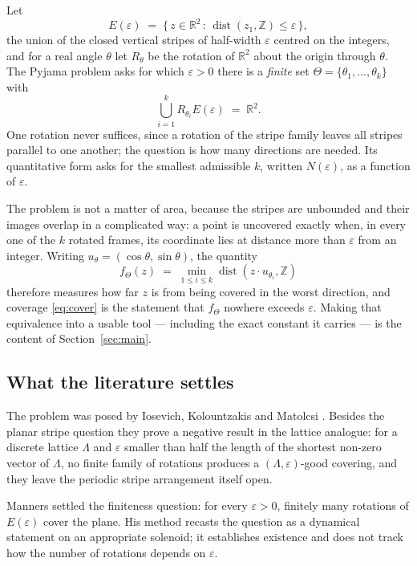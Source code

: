 \documentclass[11pt]{article}
\theoremstyle{plain}
\theoremstyle{definition}
\theoremstyle{remark}
\newcommand{\dZ}{\operatorname{dist}}
\newcommand{\R}{\mathbb{R}}
\newcommand{\Z}{\mathbb{Z}}
\begin{document}
Let
\begin{equation}
E(\varepsilon)\;=\;\{\,z\in\R^2\,:\,\dZ(z_1,\Z)\le\varepsilon\,\},
\label{eq:stripe}
\end{equation}
the union of the closed vertical stripes of half-width $\varepsilon$ centred on the integers, and for a
real angle $\theta$ let $R_\theta$ be the rotation of $\R^2$ about the origin through $\theta$. The
Pyjama problem asks for which $\varepsilon>0$ there is a \emph{finite} set
$\Theta=\{\theta_1,\dots,\theta_k\}$ with
\begin{equation}
\bigcup_{i=1}^{k}R_{\theta_i}E(\varepsilon)\;=\;\R^2 .
\label{eq:cover}
\end{equation}
One rotation never suffices, since a rotation of the stripe family leaves all stripes parallel to one
another; the question is how many directions are needed. Its quantitative form asks for the smallest
admissible $k$, written $N(\varepsilon)$, as a function of $\varepsilon$.

The problem is not a matter of area, because the stripes are unbounded and their images overlap in a
complicated way: a point is uncovered exactly when, in every one of the $k$ rotated frames, its
coordinate lies at distance more than $\varepsilon$ from an integer. Writing
$u_\theta=(\cos\theta,\sin\theta)$, the quantity
\begin{equation}
f_\Theta(z)\;=\;\min_{1\le i\le k}\dZ(z\cdot u_{\theta_i},\Z)
\label{eq:f}
\end{equation}
therefore measures how far $z$ is from being covered in the worst direction, and coverage \eqref{eq:cover}
is the statement that $f_\Theta$ nowhere exceeds $\varepsilon$. Making that equivalence into a usable
tool --- including the exact constant it carries --- is the content of Section~\ref{sec:main}.

\subsection{What the literature settles}

The problem was posed by Iosevich, Kolountzakis and Matolcsi \cite{ikm2006}. Besides the planar stripe
question they prove a negative result in the lattice analogue: for a discrete lattice $\Lambda$ and
$\varepsilon$ smaller than half the length of the shortest non-zero vector of $\Lambda$, no finite
family of rotations produces a $(\Lambda,\varepsilon)$-good covering, and they leave the periodic
stripe arrangement itself open.

Manners \cite{manners2015} settled the finiteness question: for every $\varepsilon>0$, finitely many
rotations of $E(\varepsilon)$ cover the plane. His method recasts the question as a dynamical statement
on an appropriate solenoid; it establishes existence and does not track how the number of rotations
depends on $\varepsilon$.
\end{document}
